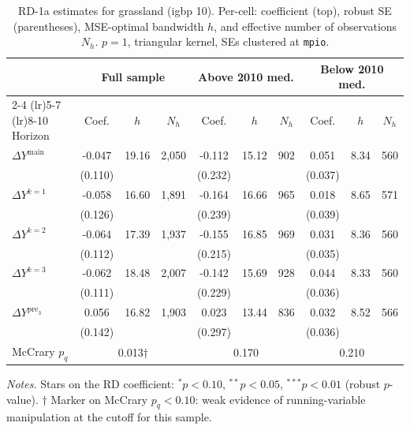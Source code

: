 \documentclass[11pt]{article}
\begin{document}
\begin{table}[H]
\centering
\scriptsize
\caption{RD-1a estimates for grassland (igbp 10). Per-cell: coefficient
(top), robust SE (parentheses), MSE-optimal bandwidth $h$, and
effective number of observations $N_h$. $p=1$, triangular kernel,
SEs clustered at \texttt{mpio}.}
\label{tab:rdplot_rd1a_grassland}
\begin{tabular}{l ccc ccc ccc}
\toprule
 & \multicolumn{3}{c}{Full sample} & \multicolumn{3}{c}{Above 2010 med.} & \multicolumn{3}{c}{Below 2010 med.} \\
\cmidrule(lr){2-4} \cmidrule(lr){5-7} \cmidrule(lr){8-10}
Horizon & Coef. & $h$ & $N_h$ & Coef. & $h$ & $N_h$ & Coef. & $h$ & $N_h$ \\
\midrule
$\Delta Y^{\text{main}}$ & -0.047 & 19.16 & 2,050 & -0.112 & 15.12 & 902 & 0.051 & 8.34 & 560 \\
 & (0.110) &  &  & (0.232) &  &  & (0.037) &  &  \\
\addlinespace[1pt]
$\Delta Y^{k=1}$ & -0.058 & 16.60 & 1,891 & -0.164 & 16.66 & 965 & 0.018 & 8.65 & 571 \\
 & (0.126) &  &  & (0.239) &  &  & (0.039) &  &  \\
\addlinespace[1pt]
$\Delta Y^{k=2}$ & -0.064 & 17.39 & 1,937 & -0.155 & 16.85 & 969 & 0.031 & 8.36 & 560 \\
 & (0.112) &  &  & (0.215) &  &  & (0.035) &  &  \\
\addlinespace[1pt]
$\Delta Y^{k=3}$ & -0.062 & 18.48 & 2,007 & -0.142 & 15.69 & 928 & 0.044 & 8.33 & 560 \\
 & (0.111) &  &  & (0.229) &  &  & (0.036) &  &  \\
\addlinespace[1pt]
$\Delta Y^{\text{pre}_3}$ & 0.056 & 16.82 & 1,903 & 0.023 & 13.44 & 836 & 0.032 & 8.52 & 566 \\
 & (0.142) &  &  & (0.297) &  &  & (0.036) &  &  \\
\addlinespace[1pt]
\midrule
McCrary $p_q$ & \multicolumn{3}{c}{0.013$\dagger$} & \multicolumn{3}{c}{0.170} & \multicolumn{3}{c}{0.210} \\
\bottomrule
\end{tabular}
\begin{flushleft}\footnotesize
\textit{Notes.} Stars on the RD coefficient: $^{*}p<0.10$,
$^{**}p<0.05$, $^{***}p<0.01$ (robust $p$-value).
$\dagger$ Marker on McCrary $p_q<0.10$: weak evidence of running-variable manipulation at the cutoff for this sample.\\
\end{flushleft}
\end{table}
\end{document}
